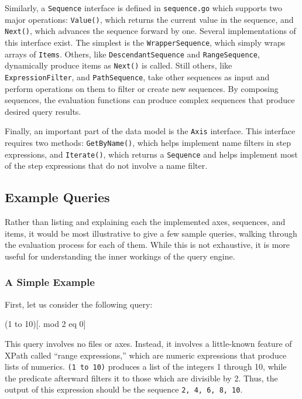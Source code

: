 \documentclass{scrartcl}
\begin{document}
Similarly, a \texttt{Sequence} interface is defined in \texttt{sequence.go}
which supports two major operations: \texttt{Value()}, which returns the current
value in the sequence, and \texttt{Next()}, which advances the sequence forward
by one. Several implementations of this interface exist. The simplest is the
\texttt{WrapperSequence}, which simply wraps arrays of \texttt{Items}. Others,
like \texttt{DescendantSequence} and \texttt{RangeSequence}, dynamically produce
items as \texttt{Next()} is called. Still others, like
\texttt{ExpressionFilter}, and \texttt{PathSequence}, take other sequences as
input and perform operations on them to filter or create new sequences. By
composing sequences, the evaluation functions can produce complex sequences that
produce desired query results.

Finally, an important part of the data model is the \texttt{Axis} interface.
This interface requires two methods: \texttt{GetByName()}, which helps implement
name filters in step expressions, and \texttt{Iterate()}, which returns a
\texttt{Sequence} and helps implement most of the step expressions that do not
involve a name filter.

\subsection{Example Queries}

Rather than listing and explaining each the implemented axes, sequences, and
items, it would be most illustrative to give a few sample queries, walking
through the evaluation process for each of them. While this is not exhaustive,
it is more useful for understanding the inner workings of the query engine.

\subsubsection{A Simple Example}

First, let us consider the following query:

\begin{center}
  \ttfamily
  (1 to 10)[. mod 2 eq 0]
\end{center}

This query involves no files or axes. Instead, it involves a little-known
feature of XPath called ``range expressions,'' which are numeric expressions
that produce lists of numerics. \texttt{(1 to 10)} produces a list of the
integers 1 through 10, while the predicate afterward filters it to those which
are divisible by 2. Thus, the output of this expression should be the sequence
\texttt{2, 4, 6, 8, 10}.
\end{document}
